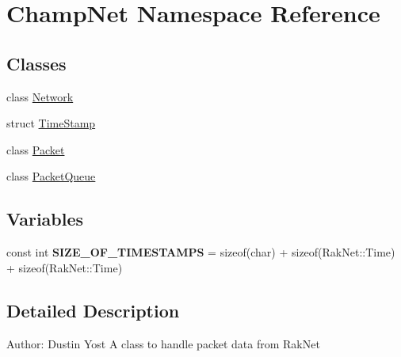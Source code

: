 \hypertarget{namespace_champ_net}{\section{Champ\-Net Namespace Reference}
\label{namespace_champ_net}
}
\subsection*{Classes}
\begin{DoxyCompactItemize}
\item 
class \hyperlink{class_champ_net_1_1_network}{Network}
\item 
struct \hyperlink{struct_champ_net_1_1_time_stamp}{Time\-Stamp}
\item 
class \hyperlink{class_champ_net_1_1_packet}{Packet}
\item 
class \hyperlink{class_champ_net_1_1_packet_queue}{Packet\-Queue}
\end{DoxyCompactItemize}
\subsection*{Variables}
\begin{DoxyCompactItemize}
\item 
\hypertarget{namespace_champ_net_ae8bece8e869e20f234d9ae67256a735f}{const int {\bfseries S\-I\-Z\-E\-\_\-\-O\-F\-\_\-\-T\-I\-M\-E\-S\-T\-A\-M\-P\-S} = sizeof(char) + sizeof(Rak\-Net\-::\-Time) + sizeof(Rak\-Net\-::\-Time)}\label{namespace_champ_net_ae8bece8e869e20f234d9ae67256a735f}

\end{DoxyCompactItemize}


\subsection{Detailed Description}
Author\-: Dustin Yost A class to handle packet data from Rak\-Net 